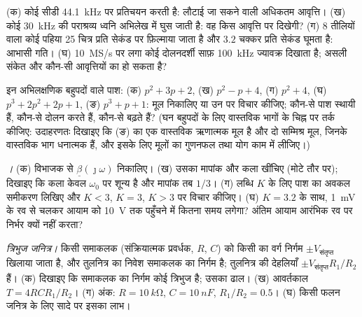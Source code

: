 \begin{exercise}[$\star$]\label{exo:b2:feedback-oscillators:4}
(क) कोई सीडी \qty{44.1}{kHz} पर प्रतिचयन करती है: लौटाई जा सकने वाली अधिकतम आवृत्ति। (ख) कोई
\qty{30}{kHz} की पराश्रव्य ध्वनि अभिलेख में घुस जाती है: वह किस आवृत्ति पर
दिखेगी? (ग) $8$ तीलियों वाला कोई पहिया \num{25} चित्र प्रति सेकंड पर फ़िल्माया जाता है और
$3.2$ चक्कर प्रति सेकंड घूमता है: आभासी गति। (घ) \qty{10}{MS/s} पर लगा कोई दोलनदर्शी
साफ़ \qty{100}{kHz} ज्यावक्र दिखाता है; असली संकेत और कौन-सी
आवृत्तियों का हो सकता है?
\end{exercise}

\begin{exercise}[$\star\star$]\label{exo:b2:feedback-oscillators:5}
इन अभिलक्षणिक बहुपदों वाले पाश: (क) $p^2 + 3p + 2$, (ख) $p^2 - p +
4$, (ग) $p^2 + 4$, (घ) $p^3 + 2p^2 + 2p + 1$, (ङ) $p^3 + p + 1$: मूल
निकालिए या उन पर विचार कीजिए; कौन-से पाश स्थायी हैं, कौन-से दोलन करते हैं, कौन-से बढ़ते हैं?
(घन बहुपदों के लिए वास्तविक भागों के चिह्न पर तर्क कीजिए: उदाहरणतः दिखाइए कि (ङ)
का एक वास्तविक ऋणात्मक मूल है और दो सम्मिश्र मूल, जिनके वास्तविक भाग धनात्मक हैं,
और इसके लिए मूलों का गुणनफल तथा योग काम में लीजिए।)
\end{exercise}

\begin{exercise}[$\star\star$]\label{exo:b2:feedback-oscillators:6}
\emph{।} (क) विभाजक से $\underline\beta(\jmath\omega)$ निकालिए।
(ख) उसका मापांक और कला खींचिए (मोटे तौर पर); दिखाइए कि कला केवल
$\omega_0$ पर शून्य है और मापांक तब $1/3$। (ग) लब्धि $K$ के लिए पाश का
अवकल समीकरण लिखिए और $K < 3$, $K = 3$, $K > 3$ पर विचार कीजिए।
(घ) $K = 3.2$ के साथ, \qty{1}{mV} के रव से चलकर आयाम को \qty{10}{V} तक
पहुँचने में कितना समय लगेगा? अंतिम आयाम आरंभिक रव पर निर्भर क्यों नहीं करता?
\end{exercise}

\begin{exercise}[$\star\star$]\label{exo:b2:feedback-oscillators:7}
\emph{त्रिभुज जनित्र।} किसी समाकलक (संक्रियात्मक प्रवर्धक, $R$, $C$) को
किसी  का वर्ग निर्गम $\pm V_{\text{संतृप्त}}$ खिलाया जाता है, और तुलनित्र का निवेश
समाकलक का निर्गम है; तुलनित्र की देहलियाँ
$\pm V_{\text{संतृप्त}}R_1/R_2$ हैं। (क) दिखाइए कि समाकलक का निर्गम कोई त्रिभुज है;
उसका ढाल। (ख) आवर्तकाल $T = 4RCR_1/R_2$। (ग) अंक: $R = \qty{10}{k\ohm}$,
$C = \qty{10}{nF}$, $R_1/R_2 = 0.5$। (घ) किसी फलन जनित्र के लिए सादे  पर इसका लाभ।
\end{exercise}

